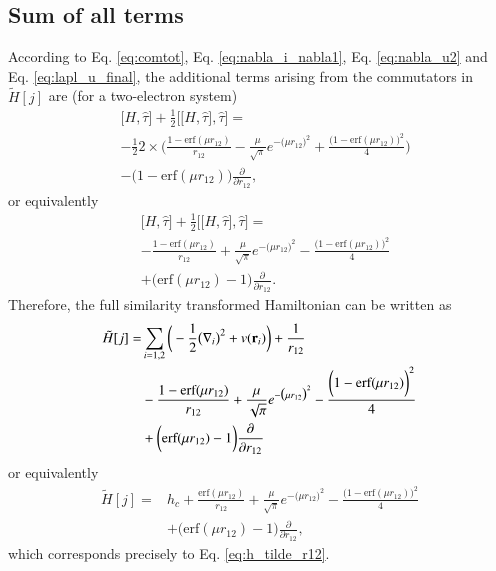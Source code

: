 \documentclass[aip,jcp,reprint,noshowkeys,superscriptaddress]{revtex4-1}
\newcommand{\deriv}[3]{\frac{\partial^{#3} #1}{\partial {#2}^{#3}}}
\newcommand{\br}[0]{{\bf {r}}}
\begin{document}
\subsection{Sum of all terms}
According to Eq. \eqref{eq:comtot}, Eq. \eqref{eq:nabla_i_nabla1}, Eq. \eqref{eq:nabla_u2} and Eq. \eqref{eq:lapl_u_final}, the additional terms arising from the commutators in $\tilde{H}[j]$ are (for a two-electron system) 
\begin{equation}
 \begin{aligned}
 \label{eq:comtot2}
 & \big[ H,\hat{\tau} \big] + \frac{1}{2} \bigg[ \big[H,\hat{\tau}\big],\hat{\tau}\bigg] =  \\
 & -\frac{1}{2} 2 \times \bigg( \frac{1 - \text{erf}(\mu r_{12})}{r_{12}} - \frac{\mu}{\sqrt{\pi}} e^{-\big(\mu r_{12} \big)^2} + \frac{\bigg(1 - \text{erf}(\mu r_{12}) \bigg)^2}{4}  \bigg) \\
   &- \bigg( 1 - \text{erf}(\mu r_{12})\bigg) \deriv{}{r_{12}}{},
 \end{aligned}
\end{equation}
or equivalently
\begin{equation}
 \begin{aligned}
 \label{eq:comtot2}
 & \big[ H,\hat{\tau} \big] + \frac{1}{2} \bigg[ \big[H,\hat{\tau}\big],\hat{\tau}\bigg] =  \\
 & -\frac{1 - \text{erf}(\mu r_{12})}{r_{12}} + \frac{\mu}{\sqrt{\pi}} e^{-\big(\mu r_{12} \big)^2} - \frac{\bigg(1 - \text{erf}(\mu r_{12}) \bigg)^2}{4} \\
   & + \bigg( \text{erf}(\mu r_{12}) - 1\bigg) \deriv{}{r_{12}}{}.
 \end{aligned}
\end{equation}
Therefore, the full similarity transformed Hamiltonian can be written as
\begin{equation}
  \begin{aligned}
   \tilde{H}[j] = & \sum_{i = 1,2} \bigg( -\frac{1}{2} \big(\nabla_i\big)^2 + v(\br{}_i)  \bigg) + \frac{1}{r_{12}} \\
&   -\frac{1 - \text{erf}(\mu r_{12})}{r_{12}} + \frac{\mu}{\sqrt{\pi}} e^{-\big(\mu r_{12} \big)^2} - \frac{\bigg(1 -     \text{erf}(\mu r_{12}) \bigg)^2}{4} \\
& + \bigg( \text{erf}(\mu r_{12}) - 1\bigg) \deriv{}{r_{12}}{}
  \end{aligned}
\end{equation}
or equivalently 
\begin{equation}
  \begin{aligned}
   \tilde{H}[j] = & h_c + \frac{\text{erf}(\mu r_{12})}{r_{12}} + \frac{\mu}{\sqrt{\pi}} e^{-\big(\mu r_{12} \big)^2} - \frac{\bigg(1 -     \text{erf}(\mu r_{12}) \bigg)^2}{4} \\
& + \bigg( \text{erf}(\mu r_{12}) - 1\bigg) \deriv{}{r_{12}}{},
  \end{aligned}
\end{equation}
which corresponds precisely to Eq. \eqref{eq:h_tilde_r12}. 
\end{document}
